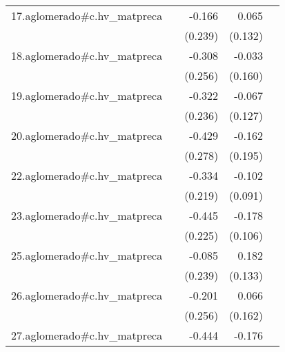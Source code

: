 {\begin{longtable}{l*{4}{D{.}{.}{-1}}}
\addlinespace
17.aglomerado#c.hv\_matpreca&                     &      -0.166         &       0.065         &                     \\
            &                     &     (0.239)         &     (0.132)         &                     \\
\addlinespace
18.aglomerado#c.hv\_matpreca&                     &      -0.308         &      -0.033         &                     \\
            &                     &     (0.256)         &     (0.160)         &                     \\
\addlinespace
19.aglomerado#c.hv\_matpreca&                     &      -0.322         &      -0.067         &                     \\
            &                     &     (0.236)         &     (0.127)         &                     \\
\addlinespace
20.aglomerado#c.hv\_matpreca&                     &      -0.429         &      -0.162         &                     \\
            &                     &     (0.278)         &     (0.195)         &                     \\
\addlinespace
22.aglomerado#c.hv\_matpreca&                     &      -0.334         &      -0.102         &                     \\
            &                     &     (0.219)         &     (0.091)         &                     \\
\addlinespace
23.aglomerado#c.hv\_matpreca&                     &      -0.445\sym{*}  &      -0.178         &                     \\
            &                     &     (0.225)         &     (0.106)         &                     \\
\addlinespace
25.aglomerado#c.hv\_matpreca&                     &      -0.085         &       0.182         &                     \\
            &                     &     (0.239)         &     (0.133)         &                     \\
\addlinespace
26.aglomerado#c.hv\_matpreca&                     &      -0.201         &       0.066         &                     \\
            &                     &     (0.256)         &     (0.162)         &                     \\
\addlinespace
27.aglomerado#c.hv\_matpreca&                     &      -0.444\sym{*}  &      -0.176\sym{***}&                     \\

\end{longtable}}
